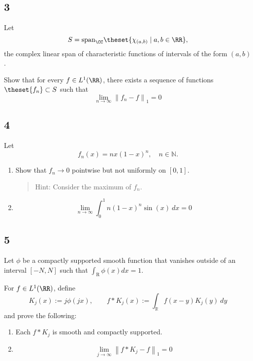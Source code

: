 \hypertarget{section-2}{%
\subsection{3}\label{section-2}}

Let \[
S = \mathrm{span}_\CC\theset{\chi_{(a, b)} \mid a, b \in \RR},
\] the complex linear span of characteristic functions of intervals of
the form \((a, b)\).

Show that for every \(f\in L^1(\RR)\), there exists a sequence of
functions \(\theset{f_n} \subset S\) such that \[
\lim _{n \rightarrow \infty}\left\|f_{n}-f\right\|_{1}=0
\]

\hypertarget{section-3}{%
\subsection{4}\label{section-3}}

Let \[
f_{n}(x)=n x(1-x)^{n}, \quad n \in \mathbb{N}.
\]

\begin{enumerate}
\def\labelenumi{\arabic{enumi}.}
\item
  Show that \(f_n \to 0\) pointwise but not uniformly on \([0, 1]\).

  \begin{quote}
  Hint: Consider the maximum of \(f_n\).
  \end{quote}
\item
  \[
    \lim _{n \rightarrow \infty} \int_{0}^{1} n(1-x)^{n} \sin(x) ~d x=0
  \]
\end{enumerate}

\hypertarget{section-4}{%
\subsection{5}\label{section-4}}

Let \(\phi\) be a compactly supported smooth function that vanishes
outside of an interval \([-N, N]\) such that
\(\int_{\mathrm{R}} \phi(x) d x=1\).

For \(f\in L^1(\RR)\), define \[
K_{j}(x):=j \phi(j x), \quad \quad f \ast K_{j}(x):=\int_{\mathbb{R}} f(x-y) K_{j}(y) ~d y
\] and prove the following:

\begin{enumerate}
\def\labelenumi{\arabic{enumi}.}
\item
  Each \(f\ast K_j\) is smooth and compactly supported.
\item
  \[
  \lim _{j \rightarrow \infty}\left\|f * K_{j}-f\right\|_{1}=0
  \]
\end{enumerate}

